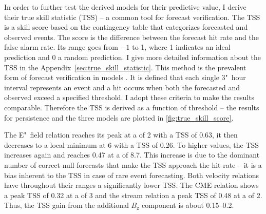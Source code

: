 In order to further test the derived models for their predictive value, I derive their true skill statistic (TSS) -- a common tool for forecast verification. The TSS is a skill score based on the contingency table that categorizes forecasted and observed events. The score is the difference between the forecast hit rate and the false alarm rate. Its range goes from $-1$ to 1, where 1 indicates an ideal prediction and 0 a random prediction. I give more detailed information about the TSS in the Appendix~\ref{sec:true_skill_statistic}. This method is the prevalent form of forecast verification in \Kp{} models \citep{Detman1999,Wing2005,Savani2017}. It is defined that each single 3"~hour \Kp{} interval represents an event and a hit occurs when both the forecasted and observed \Kp{} exceed a specified threshold. I adopt these criteria to make the results comparable. Therefore the TSS is derived as a function of \Kp{} threshold -- the results for persistence and the three models are plotted in \autoref{fig:true_skill_score}.
\begin{figure}
\end{figure}

The E"~field relation reaches its peak at a \Kp{} of 2 with a TSS of 0.63, it then decreases to a local minimum at \Kp{} 6 with a TSS of 0.26. To higher \Kp{} values, the TSS increases again and reaches 0.47 at a \Kp{} of 8.7. This increase is due to the dominant number of correct null forecasts that make the TSS approach the hit rate \citep{Doswell1990} -- it is a bias inherent to the TSS in case of rare event forecasting. Both velocity relations have throughout their \Kp{} ranges a significantly lower TSS. The CME relation shows a peak TSS of 0.32 at a \Kp{} of 3 and the stream relation a peak TSS of 0.48 at a \Kp{} of 2. Thus, the TSS gain from the additional $B_\text{z}$ component is about \numrange{0.15}{0.2}.

